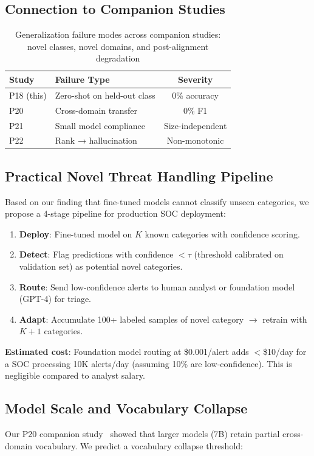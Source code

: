 \documentclass[journal]{IEEEtran}
\begin{document}
\subsection{Connection to Companion Studies}

\begin{table}[!ht]
\centering\caption{Generalization failure modes across companion studies: novel classes, novel domains, and post-alignment degradation}
\label{tab:cross}
\begin{tabular}{llc}
\toprule
\textbf{Study} & \textbf{Failure Type} & \textbf{Severity} \\
\midrule
P18 (this) & Zero-shot on held-out class & 0\% accuracy \\
P20~\cite{p20} & Cross-domain transfer & 0\% F1 \\
P21~\cite{p21} & Small model compliance & Size-independent \\
P22~\cite{p22} & Rank → hallucination & Non-monotonic \\
\bottomrule
\end{tabular}
\end{table}

\subsection{Practical Novel Threat Handling Pipeline}
Based on our finding that fine-tuned models cannot classify unseen categories, we propose a 4-stage pipeline for production SOC deployment:

\begin{enumerate}
\item \textbf{Deploy}: Fine-tuned model on $K$ known categories with confidence scoring.
\item \textbf{Detect}: Flag predictions with confidence $< \tau$ (threshold calibrated on validation set) as potential novel categories.
\item \textbf{Route}: Send low-confidence alerts to human analyst or foundation model (GPT-4) for triage.
\item \textbf{Adapt}: Accumulate 100+ labeled samples of novel category $\to$ retrain with $K+1$ categories.
\end{enumerate}

\textbf{Estimated cost}: Foundation model routing at \$0.001/alert adds $<$\$10/day for a SOC processing 10K alerts/day (assuming 10\% are low-confidence). This is negligible compared to analyst salary.

\subsection{Model Scale and Vocabulary Collapse}
Our P20 companion study~\cite{p20} showed that larger models (7B) retain partial cross-domain vocabulary. We predict a vocabulary collapse threshold:
\end{document}
